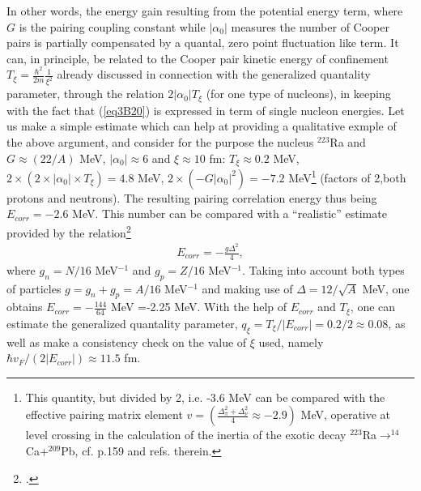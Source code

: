 \begin{subappendices}
 
 In other words, the energy gain resulting from the potential energy term, where $G$ is the pairing coupling constant while $|\alpha_0|$ measures the number of Cooper pairs is partially compensated by a quantal, zero point fluctuation like term. It can, in principle, be related to the Cooper pair kinetic energy of confinement $T_\xi=\frac{\hbar^2}{2m}\frac{1}{\xi^2}$ already discussed in connection with the generalized quantality parameter, through the relation $2|\alpha_0|T_\xi$ (for one type of nucleons), in keeping with the fact that (\ref{eq3B20}) is expressed in term of single nucleon energies. Let us make a simple estimate which can help at providing a qualitative exmple of the above argument, and consider for the purpose the nucleus $^{223}$Ra and $G\approx(22/A)$ MeV, $|\alpha_0|\approx 6$ and $\xi\approx 10$ fm: $T_\xi\approx 0.2 $ MeV, $2\times(2\times|\alpha_0|\times T_\xi)=4.8$ MeV, $2\times (-G|\alpha_0|^2)=-7.2$ MeV\footnote{This quantity, but divided by 2, i.e. -3.6 MeV can be compared with the effective pairing matrix element $v=\left(\frac{\Delta_\pi^2+\Delta_\nu^2}{4}\approx -2.9 \right)$ MeV, operative at level crossing in the calculation of the inertia of the exotic decay $^{223}$Ra$\rightarrow^{14}$Ca+$^{209}$Pb, cf. \cite{Brink:05} p.159 and refs. therein.} (factors of 2,both protons and neutrons). The resulting pairing correlation energy thus being $E_{corr}=-2.6$ MeV. This number can be compared with a ``realistic'' estimate provided by the relation\footnote{\cite{Brink:05}.}
   \begin{align}\label{eq3B21}
E_{corr}=-\frac{g\Delta^2}{4},
   \end{align}  
 where $g_n=N/16$ MeV$^{-1}$ and $g_p=Z/16$ MeV$^{-1}$. Taking into account both types of particles $g=g_n+g_p=A/16$ MeV$^{-1}$ and making use of $\Delta=12/\sqrt{A}$ MeV, one obtains $E_{corr}=-\frac{144}{64}$ MeV =-2.25 MeV. With the help of $E_{corr}$ and $T_\xi$, one can estimate the generalized quantality parameter, $q_\xi=T_\xi/|E_{corr}|=0.2/2\approx 0.08$, as well as make a consistency check  on the value of $\xi$ used, namely $\hbar v_F/(2|E_{corr}|)\approx 11.5$ fm.
 

\end{subappendices}
